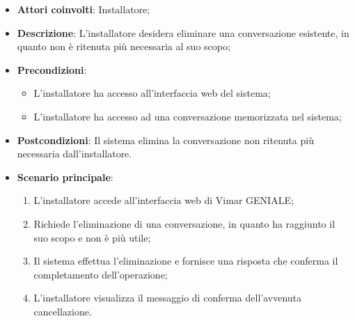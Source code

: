 \begin{itemize}
    \item \textbf{Attori coinvolti}: Installatore;
    \item \textbf{Descrizione}: L’installatore desidera eliminare una conversazione esistente, in quanto non è ritenuta più necessaria al suo scopo;
    \item \textbf{Precondizioni}: 
        \begin{itemize}
            \item L’installatore ha accesso all’interfaccia web del sistema;
            \item L’installatore ha accesso ad una conversazione memorizzata nel sistema;
        \end{itemize}
    \item \textbf{Postcondizioni}: Il sistema elimina la conversazione non ritenuta più necessaria dall’installatore.
    \item \textbf{Scenario principale}:
    \begin{enumerate}
    \item L’installatore accede all’interfaccia web di Vimar GENIALE;
    \item Richiede l’eliminazione di una conversazione, in quanto ha raggiunto il suo scopo e non è più utile;
    \item Il sistema effettua l’eliminazione e fornisce una risposta che conferma il completamento dell’operazione;
    \item L’installatore visualizza il messaggio di conferma dell’avvenuta cancellazione.
    \end{enumerate}
\end{itemize}

